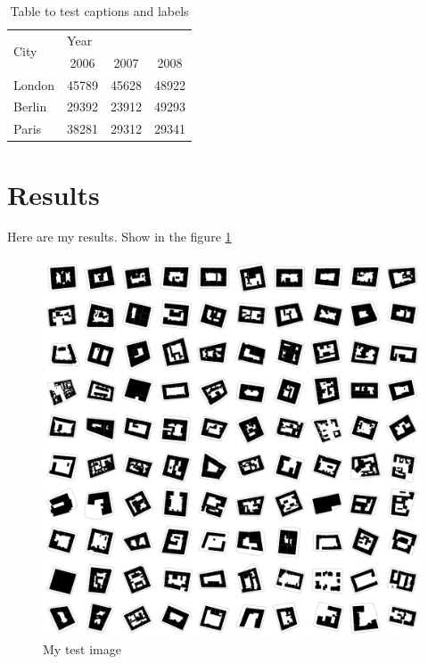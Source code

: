 \documentclass[a4paper,12pt]{article}
\begin{document}
\begin{table}[h!]
    \centering
    \caption{Table to test captions and labels} %
    \label{table:1}
    \begin{tabular}{ l | c c c }

        \multirow{2}{4em}{City} & \multicolumn{3}{l}{Year} \\ 
        \cline{2-4}
                           & 2006 & 2007 & 2008 \\
        \hline
        London & 45789 & 45628 & 48922 \\
        Berlin & 29392 & 23912 & 49293 \\
        Paris & 38281 & 29312 & 29341 \\
    \end{tabular}
\end{table}

\section{Results}
Here are my results. Show in the figure \ref{resulttest}

\begin{figure}[ht!] %
    \centering
    \includegraphics[width=1\textwidth]{images/result.jpg}
    \caption{My test image}
    \label{resulttest} %
\end{figure}

\newpage


\newpage
\listoffigures
\end{document}
